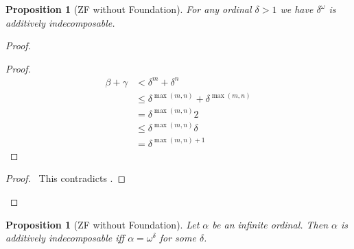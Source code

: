 \documentclass{book}
\let\qed\relax
\newtheorem{prop}[ax]{Proposition}
\theoremstyle{definition}
\begin{document}
\begin{prop}[ZF without Foundation]
For any ordinal $\delta > 1$ we have $\delta^\omega$ is additively indecomposable.
\end{prop}

\begin{proof}
\pf
{}
\begin{proof}
	\pf
	\begin{align*}
		\beta + \gamma & < \delta^m + \delta^n \\
		& \leq \delta^{\max(m,n)} + \delta^{\max(m,n)} \\
		& = \delta^{\max(m,n)} 2 \\
		& \leq \delta^{\max(m,n)} \delta \\
		& = \delta^{\max(m,n) + 1}
	\end{align*}
\end{proof}
\qedstep
\begin{proof}
	\pf\ This contradicts .
\end{proof}
\qed
\end{proof}

\begin{prop}[ZF without Foundation]
Let $\alpha$ be an infinite ordinal. Then $\alpha$ is additively indecomposable iff $\alpha = \omega^\delta$ for some $\delta$.
\end{prop}
\end{document}
